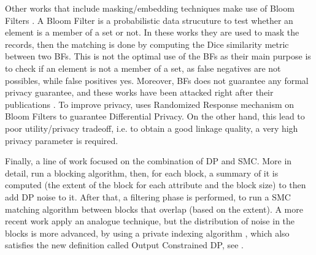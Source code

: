 \documentclass[12pt]{article}
\begin{document}
Other works that include masking/embedding techniques make use of Bloom Filters \cite*{schnell2009privacy, durham2013composite}. A Bloom Filter is a probabilistic data strucuture to test whether an element is a member of a set or not. In these works they are used to mask the records, then the matching is done by computing the Dice similarity metric between two BFs. This is not the optimal use of the BFs as their main purpose is to check if an element is not a member of a set, as false negatives are not possibles, while false positives yes. Moreover, BFs does not guarantee any formal privacy guarantee, and these works have been attacked right after their publications \cite*{christen2017efficient, christen2018precise, christen2018pattern, kroll2014automated}. To improve privacy, \cite*{sequence_BF_DP, schnell_randomized_2016} uses Randomized Response mechanism on Bloom Filters to guarantee Differential Privacy. On the other hand, this lead to poor utility/privacy tradeoff, i.e. to obtain a good linkage quality, a very high privacy parameter is required. 

Finally, a line of work focused on the combination of DP and SMC. More in detail, \cite*{Inan2010PrivateRM} run a blocking algorithm, then, for each block, a summary of it is computed (the extent of the block for each attribute and the block size) to then add DP noise to it. After that, a filtering phase is performed, to run a SMC matching algorithm between blocks that overlap (based on the extent). A more recent work apply an analogue technique, but the distribution of noise in the blocks is more advanced, by using a private indexing algorithm \cite*{rao_hybrid_2019}, which also satisfies the new definition called Output Constrained DP, see \cite{he_composing_2017}.

%
%
\end{document}
